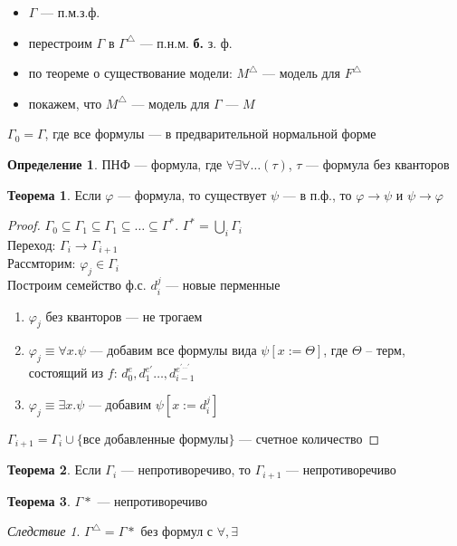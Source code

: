 \documentclass[oneside]{book}
\theoremstyle{plain}
\theoremstyle{remark}
\newtheorem{corollary}{Следствие}[theorem]
\theoremstyle{definition}
\newtheorem{theorem}{Теорема}[section]
\newtheorem*{definition}{Определение}
\begin{document}
\begin{itemize}
\item \(\Gamma\) --- п.м.з.ф.
\item перестроим \(\Gamma\) в \(\Gamma^\triangle\) --- п.н.м. \textbf{б.} з. ф.
\item по теореме о существование модели: \(M^\triangle\) --- модель для \(F^\triangle\)
\item покажем, что \(M^\triangle\) --- модель для \(\Gamma\) --- \(M\)
\end{itemize}
\(\Gamma_0 = \Gamma\), где все формулы --- в предварительной нормальной форме
\begin{definition}
ПНФ --- формула, где \(\forall \exists \forall \dots(\tau)\), \(\tau\) --- формула без кванторов
\end{definition}
\begin{theorem}
Если \(\varphi\) --- формула, то существует \(\psi\) --- в п.ф., то \(\varphi \to \psi\) и \(\psi \to \varphi\)
\end{theorem}
\begin{proof}
\(\Gamma_0 \subseteq \Gamma_1 \subseteq \Gamma_1 \subseteq \dots \subseteq \Gamma^*\). \(\Gamma^* = \bigcup_i \Gamma_i\) \\
Переход: \(\Gamma_i \to \Gamma_{i + 1}\) \\
Рассмторим: \(\varphi_j \in \Gamma_i\) \\
Построим семейство ф.с. \(d^j_i\) --- новые перменные
\begin{enumerate}
\item \(\varphi_j\) без кванторов --- не трогаем
\item \(\varphi_j \equiv \forall x. \psi\) --- добавим все формулы вида \(\psi[x := \Theta]\), где \(\Theta\) -- терм, состоящий из \(f\): \(d_0^e, d_1^{e'} \dots , d_{i - 1}^{e^{'\dots'}}\)
\item \(\varphi_j \equiv \exists x. \psi\) --- добавим \(\psi[x:=d^j_i]\)
\end{enumerate}
\(\Gamma_{i + 1} = \Gamma_i \cup \{\text{все добавленные формулы}\}\) --- счетное количество
\end{proof}
\begin{theorem}
Если \(\Gamma_i\) --- непротиворечиво, то \(\Gamma_{i + 1}\) --- непротиворечиво
\end{theorem}
\begin{theorem}
\(\Gamma*\) --- непротиворечиво
\end{theorem}
\begin{corollary}
\(\Gamma^\triangle = \Gamma*\) без формул с \(\forall, \exists\)
\end{corollary}
\end{document}
